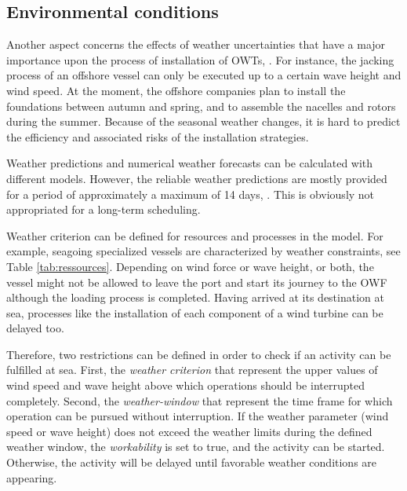 \subsection{Environmental conditions}
Another aspect concerns the effects of weather uncertainties that have a major importance upon the process of installation of OWTs, \cite{COMPIT11}. For instance, the jacking process of an offshore vessel can only be executed up to a certain wave height and wind speed. At the moment, the offshore companies plan to install the foundations between autumn and spring, and to assemble the nacelles and rotors during the summer. Because of the seasonal weather changes, it is hard to predict the efficiency and associated risks of the installation strategies.

Weather predictions and numerical weather forecasts can be calculated with different models. However, the reliable weather predictions are mostly provided for a period of approximately a maximum of 14 days, \cite{Hinnenthal_2010}. This is obviously not appropriated for a long-term scheduling.

Weather criterion can be defined for resources and processes in the model. For example, seagoing specialized vessels are characterized by weather constraints, see Table \ref{tab:ressources}. Depending on wind force or wave height, or both, the vessel might not be allowed to leave the port and start its journey to the OWF although the loading process is completed. Having arrived at its destination at sea, processes like the installation of each component of a wind turbine can be delayed too.

Therefore, two restrictions can be defined in order to check if an activity can be fulfilled at sea. First, the \textit{weather criterion} that represent the upper values of wind speed and wave height above which operations should be interrupted completely. Second, the \textit{weather-window} that represent the time frame for which operation can be pursued without interruption.  If the weather parameter (wind speed or wave height) does not exceed the weather limits during the defined weather window, the \textit{workability} is set to true, and the activity can be started. Otherwise, the activity will be delayed until favorable weather conditions are appearing.

